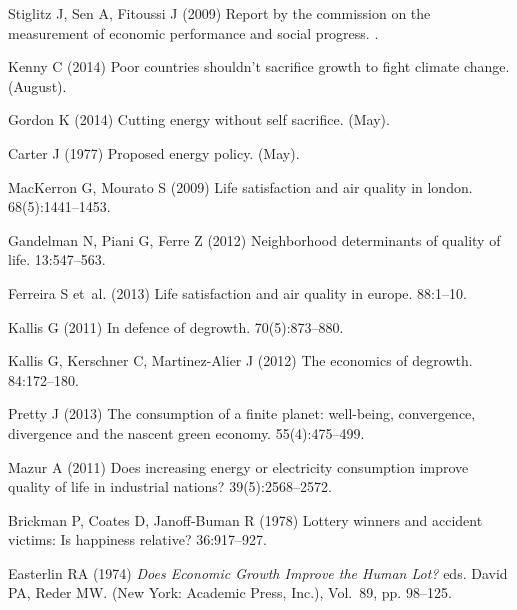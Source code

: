 \documentclass[10pt, letterpaper]{article}
\begin{document}
\begin{spacing}{1.4}
\begin{thebibliography}{10}
Stiglitz J, Sen A, Fitoussi J (2009) Report by the commission on the
  measurement of economic performance and social progress.
.

Kenny C (2014) Poor countries shouldn't sacrifice growth to fight climate
  change.
 (August).

Gordon K (2014) Cutting energy without self sacrifice.
 (May).

Carter J (1977) Proposed energy policy.
 (May).

MacKerron G, Mourato S (2009) Life satisfaction and air quality in london.
 68(5):1441--1453.

Gandelman N, Piani G, Ferre Z (2012) Neighborhood determinants of quality of
  life.
 13:547--563.

Ferreira S et~al. (2013) Life satisfaction and air quality in europe.
 88:1--10.

Kallis G (2011) In defence of degrowth.
 70(5):873--880.

Kallis G, Kerschner C, Martinez-Alier J (2012) The economics of degrowth.
 84:172--180.

Pretty J (2013) The consumption of a finite planet: well-being, convergence,
  divergence and the nascent green economy.
 55(4):475--499.

Mazur A (2011) Does increasing energy or electricity consumption improve
  quality of life in industrial nations?
 39(5):2568--2572.

Brickman P, Coates D, Janoff-Buman R (1978) Lottery winners and accident
  victims: Is happiness relative?
 36:917--927.

Easterlin RA (1974) {\em Does Economic Growth Improve the Human Lot?} eds.{}
  David PA, Reder MW.
\newblock (New York: Academic Press, Inc.), Vol.{}~89, pp. 98--125.


\end{thebibliography}
\end{spacing}
\end{document}
